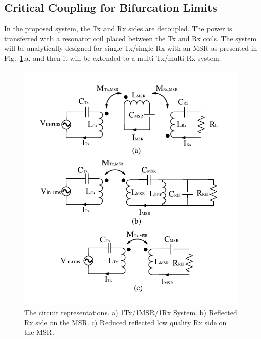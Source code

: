 \documentclass[journal]{IEEEtran}
\begin{document}
\subsection{Critical Coupling for Bifurcation Limits}
In the proposed system, the Tx and Rx sides are decoupled. 
The power is transferred with a resonator coil placed between the Tx and Rx coils. 
The system will be analytically designed for single-Tx/single-Rx with an MSR as presented in 
Fig.~\ref{fig:reflected}.a, and then it will be extended to a multi-Tx/multi-Rx system. 
 \begin{figure}[h!]
     \centering
        	\includegraphics[width=0.95\linewidth]{reflected_impedance.pdf}
\caption{The circuit representations. a) 1Tx/1MSR/1Rx System. b) Reflected Rx side on the MSR. c) Reduced reflected low quality Rx side on the MSR.}
        \label{fig:reflected}
\end{figure}
\end{document}
